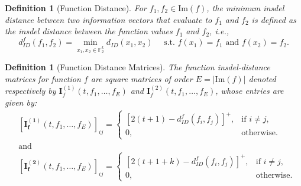 \documentclass[11 pt]{article}
\numberwithin{equation}{section}
\newtheorem{definition}[theorem]{Definition}
\begin{document}
    \begin{definition}[Function Distance] For \(f_1, f_2 \in \mathrm{Im}(f)\), the minimum insdel distance between two information vectors that evaluate to \( f_1 \) and \( f_2 \)  is defined as the insdel distance between the function values $f_1$ and $f_2$, i.e.,
        \[
         d_{ID}^f (f_1, f_2) = \min_{x_1, x_2 \in \mathbb{F}_2^k} d_{ID}(x_1, x_2) \quad \text{ s.t. } f(x_1) = f_1 \text{ and } f(x_2) = f_2.
        \]
    \end{definition}
    


        \begin{definition}[Function Distance Matrices] 
        \label{def:function-dis-matrices}The function insdel-distance matrices for function $f$ are square matrices of order $E  = |\mathrm{Im}(f)|$ denoted respectively by $\boldsymbol{I}_f^{(1)}(t,f_1,\ldots, f_E)$ and $\boldsymbol{I}_f^{(2)}(t,f_1,\ldots, f_E)$, whose entries are given by:
        {\footnotesize
            \begin{align*}
            &[\boldsymbol{I_f^{(1)}}( t, f_1, \dots, f_E)]_{ij} = 
            \begin{cases} 
                [2(t + 1) - d_{ID}^f (f_i, f_j)]^{+}, & \text{if } i \neq j, \\ 
                0, & \text{otherwise}.
            \end{cases}\\
            &\text{and}\\
            &[\boldsymbol{I_f^{(2)}}( t, f_1, \dots, f_E)]_{ij} = 
            \begin{cases} 
                [2(t + 1 + k)  - d_{ID}^f (f_i, f_j)]^{+}, & \text{if } i \neq j, \\ 
                0, & \text{otherwise}.
            \end{cases}
        \end{align*}
        }       
        \end{definition}
\end{document}
